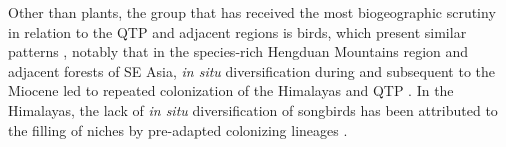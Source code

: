 


Other than plants, the group that has received the most biogeographic scrutiny in relation to the QTP and adjacent regions is birds, which present similar patterns \citep[see][]{packert2015}, notably that in the species-rich Hengduan Mountains region and adjacent forests of SE Asia, \textit{in situ} diversification during and subsequent to the Miocene led to repeated colonization of the Himalayas and QTP \citep[e.g.,][]{liu2016,tietze2013,johansson2007}. In the Himalayas, the lack of \textit{in situ} diversification of songbirds has been attributed to the filling of niches by pre-adapted colonizing lineages \citep{price2014}.




